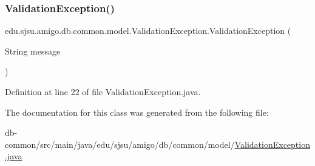 \subsubsection{\texorpdfstring{Validation\+Exception()}{ValidationException()}}
{\footnotesize\ttfamily edu.\+sjsu.\+amigo.\+db.\+common.\+model.\+Validation\+Exception.\+Validation\+Exception (\begin{DoxyParamCaption}\item[{String}]{message }\end{DoxyParamCaption})}



Definition at line 22 of file Validation\+Exception.\+java.



The documentation for this class was generated from the following file\+:\begin{DoxyCompactItemize}
\item 
db-\/common/src/main/java/edu/sjsu/amigo/db/common/model/\hyperlink{_validation_exception_8java}{Validation\+Exception.\+java}\end{DoxyCompactItemize}
